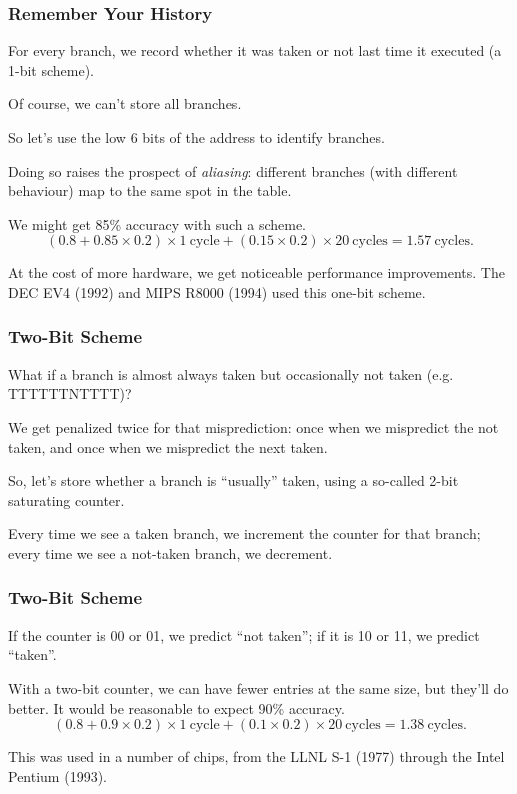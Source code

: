 \begin{frame}
\frametitle{Remember Your History}

For every branch,
we record whether it was taken or not last time it executed (a 1-bit scheme).


Of course, we can't store all branches. 

So let's use the low 6 bits of the address
to identify branches. 

Doing so raises the prospect of \emph{aliasing}:
different branches (with different behaviour) map to the same spot in the table.

We might get 85\% accuracy with such a scheme.
\[
(0.8 + 0.85 \times 0.2) \times 1 \mathrm{~cycle} + (0.15 \times 0.2) \times 20 \mathrm{~cycles} = 1.57 \mathrm{~cycles}.
\]

At the cost of more hardware, we get noticeable performance improvements. The DEC EV4 (1992) and
MIPS R8000 (1994) used this one-bit scheme.

\end{frame}


\begin{frame}
\frametitle{Two-Bit Scheme}

What if a branch is almost always taken but occasionally not taken (e.g. TTTTTTNTTTT)?

We get penalized twice
for that misprediction: once when we mispredict the not taken, and once when we mispredict the next taken. 

So, let's store whether a branch is ``usually'' taken, using a so-called
2-bit saturating counter.

Every time we see a taken branch, we increment the counter for that
branch; every time we see a not-taken branch, we decrement. 

\end{frame}


\begin{frame}
\frametitle{Two-Bit Scheme}

If the counter is 00 or 01, we predict ``not taken''; if it is 10 or
11, we predict ``taken''.

With a two-bit counter, we can have fewer entries at the same size, but they'll do better.
It would be reasonable to expect 90\% accuracy.
\[
(0.8 + 0.9 \times 0.2) \times 1 \mathrm{~cycle} + (0.1 \times 0.2) \times 20 \mathrm{~cycles} = 1.38 \mathrm{~cycles}.
\]

This was used in a number of chips, from the LLNL S-1 (1977) through the Intel Pentium (1993).



\end{frame}


